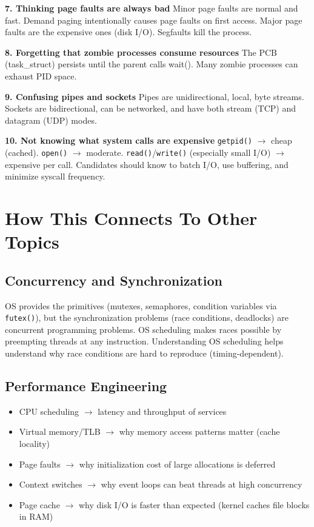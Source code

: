 \documentclass[11pt]{article}
\providecommand{\tightlist}{\setlength{\itemsep}{1pt}\setlength{\parskip}{0pt}}
\begin{document}
\textbf{7. Thinking page faults are always bad}
Minor page faults are normal and fast. Demand paging intentionally causes page faults on first access. Major page faults are the expensive ones (disk I/O). Segfaults kill the process.

\textbf{8. Forgetting that zombie processes consume resources}
The PCB (task\_struct) persists until the parent calls wait(). Many zombie processes can exhaust PID space.

\textbf{9. Confusing pipes and sockets}
Pipes are unidirectional, local, byte streams. Sockets are bidirectional, can be networked, and have both stream (TCP) and datagram (UDP) modes.

\textbf{10. Not knowing what system calls are expensive}
\texttt{getpid()} \(\rightarrow\) cheap (cached). \texttt{open()} \(\rightarrow\) moderate. \texttt{read()}/\texttt{write()} (especially small I/O) \(\rightarrow\) expensive per call. Candidates should know to batch I/O, use buffering, and minimize syscall frequency.

\section{How This Connects To Other Topics}\label{how-this-connects-to-other-topics}

\subsection{Concurrency and Synchronization}\label{concurrency-and-synchronization}

OS provides the primitives (mutexes, semaphores, condition variables via \texttt{futex()}), but the synchronization problems (race conditions, deadlocks) are concurrent programming problems. OS scheduling makes races possible by preempting threads at any instruction. Understanding OS scheduling helps understand why race conditions are hard to reproduce (timing-dependent).

\subsection{Performance Engineering}\label{performance-engineering}

\begin{itemize}
\tightlist
\item
  CPU scheduling \(\rightarrow\) latency and throughput of services
\item
  Virtual memory/TLB \(\rightarrow\) why memory access patterns matter (cache locality)
\item
  Page faults \(\rightarrow\) why initialization cost of large allocations is deferred
\item
  Context switches \(\rightarrow\) why event loops can beat threads at high concurrency
\item
  Page cache \(\rightarrow\) why disk I/O is faster than expected (kernel caches file blocks in RAM)
\end{itemize}
\end{document}
